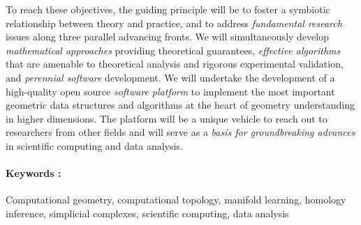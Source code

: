 To reach these objectives, the guiding principle  will be to foster a
symbiotic relationship between theory and practice, and to address
{\em fundamental research} issues along three parallel advancing
fronts. We will simultaneously develop {\em mathematical approaches}
providing theoretical guarantees, {\em effective algorithms} that are
amenable to theoretical analysis and rigorous experimental validation,
and {\em perennial software} development.  We will undertake the
development of a high-quality open source {\em software platform} to
implement the most important geometric data structures and algorithms
at the heart of geometry understanding in higher dimensions. The
platform will be a unique vehicle to reach out to researchers from other
fields and will serve as a {\em basis for groundbreaking advances} in
scientific computing and data analysis.

\paragraph{Keywords :} Computational geometry, computational topology,
manifold learning, homology inference, simplicial complexes,
scientific computing, data analysis
